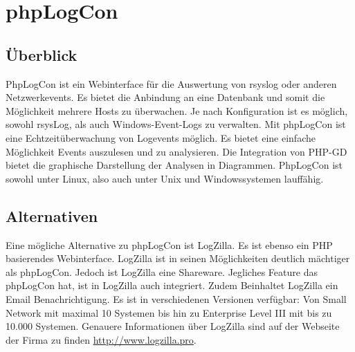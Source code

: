 \section{phpLogCon}
\subsection{Überblick}
PhpLogCon ist ein Webinterface für die Auswertung von rsyslog oder anderen Netzwerkevents. Es bietet die Anbindung an eine Datenbank und somit die Möglichkeit mehrere Hosts zu überwachen. Je nach Konfiguration ist es möglich, sowohl rsysLog, als auch Windows-Event-Logs zu verwalten. Mit phpLogCon ist eine Echtzeitüberwachung von Logevents möglich. Es bietet eine einfache Möglichkeit Events auszulesen und zu analysieren. Die Integration von PHP-GD bietet die graphische Darstellung der Analysen in Diagrammen.
PhpLogCon ist sowohl unter Linux, also auch unter Unix und Windowssystemen lauffähig.

\subsection{Alternativen}
Eine mögliche Alternative zu phpLogCon ist LogZilla. Es ist ebenso ein PHP basierendes Webinterface. LogZilla ist in seinen Möglichkeiten deutlich mächtiger als phpLogCon. Jedoch ist LogZilla eine Shareware. Jegliches Feature das phpLogCon hat, ist in LogZilla auch integriert. Zudem Beinhaltet LogZilla ein Email Benachrichtigung. Es ist in verschiedenen Versionen verfügbar: Von Small Network mit maximal 10 Systemen bis hin zu Enterprise Level III mit bis zu 10.000 Systemen. Genauere Informationen über LogZilla sind auf der Webseite der Firma zu finden \url{http://www.logzilla.pro}.
